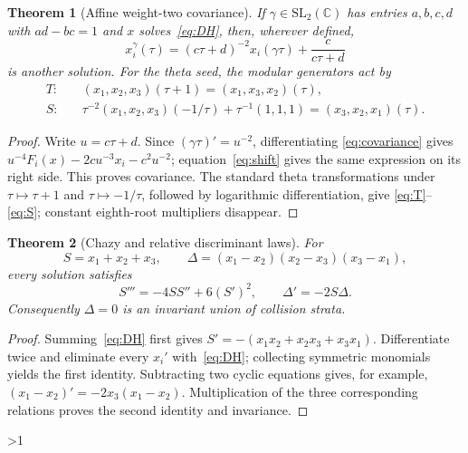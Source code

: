 \documentclass[10pt]{article}
\providecommand{\CRevisionRound}{2}
\newtheorem{theorem}{Theorem}
\newcommand{\CC}{\mathbb C}
\begin{document}
\begin{theorem}[Affine weight-two covariance]\label{thm:covariance}
If $\gamma\in\mathrm{SL}_2(\CC)$ has entries $a,b,c,d$ with $ad-bc=1$
and $x$ solves~\eqref{eq:DH}, then, wherever defined,
\begin{equation}\label{eq:covariance}
 x_i^\gamma(\tau)=(c\tau+d)^{-2}x_i(\gamma\tau)
 +\frac c{c\tau+d}
\end{equation}
is another solution.  For the theta seed, the modular generators act by
\begin{align}
 T:\quad &(x_1,x_2,x_3)(\tau+1)=(x_1,x_3,x_2)(\tau),\label{eq:T}\\
 S:\quad &\tau^{-2}(x_1,x_2,x_3)(-1/\tau)+\tau^{-1}(1,1,1)
 =(x_3,x_2,x_1)(\tau).\label{eq:S}
\end{align}
\end{theorem}
\begin{proof}
Write $u=c\tau+d$.  Since $(\gamma\tau)'=u^{-2}$, differentiating
\eqref{eq:covariance} gives
$u^{-4}F_i(x)-2cu^{-3}x_i-c^2u^{-2}$; equation~\eqref{eq:shift} gives the
same expression on its right side.  This proves covariance.  The standard
theta transformations under $\tau\mapsto\tau+1$ and
$\tau\mapsto-1/\tau$, followed by logarithmic differentiation, give
\eqref{eq:T}--\eqref{eq:S}; constant eighth-root multipliers disappear.
\end{proof}

\begin{theorem}[Chazy and relative discriminant laws]\label{thm:chazy}
For
\[
 S=x_1+x_2+x_3,\qquad
 \Delta=(x_1-x_2)(x_2-x_3)(x_3-x_1),
\]
every solution satisfies
\begin{equation}\label{eq:chazy}
 S'''=-4SS''+6(S')^2,
 \qquad \Delta'=-2S\Delta.
\end{equation}
Consequently $\Delta=0$ is an invariant union of collision strata.
\end{theorem}
\begin{proof}
Summing~\eqref{eq:DH} first gives
$S'=-(x_1x_2+x_2x_3+x_3x_1)$.  Differentiate twice and eliminate every
$x_i'$ with~\eqref{eq:DH}; collecting symmetric monomials yields the first
identity.  Subtracting two cyclic equations gives, for example,
$(x_1-x_2)'=-2x_3(x_1-x_2)$.  Multiplication of the three corresponding
relations proves the second identity and invariance.
\end{proof}
\fi

\ifnum\CRevisionRound>1
\end{document}
